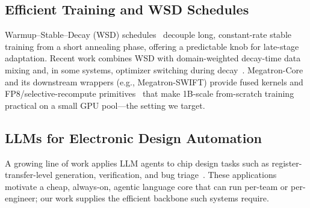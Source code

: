 \subsection{Efficient Training and WSD Schedules}
Warmup--Stable--Decay (WSD) schedules~\cite{minicpm2024} decouple long, constant-rate stable training from a short annealing phase, offering a predictable knob for late-stage adaptation.
Recent work combines WSD with domain-weighted decay-time data mixing and, in some systems, optimizer switching during decay~\cite{jordan2024muon}.
Megatron-Core and its downstream wrappers (e.g., Megatron-SWIFT) provide fused kernels and FP8/selective-recompute primitives~\cite{nvidia-megatron} that make 1B-scale from-scratch training practical on a small GPU pool---the setting we target.

\subsection{LLMs for Electronic Design Automation}
A growing line of work applies LLM agents to chip design tasks such as register-transfer-level generation, verification, and bug triage~\cite{liu2023chipnemo,blocklove2024chip}.
These applications motivate a cheap, always-on, agentic language core that can run per-team or per-engineer; our work supplies the efficient backbone such systems require.